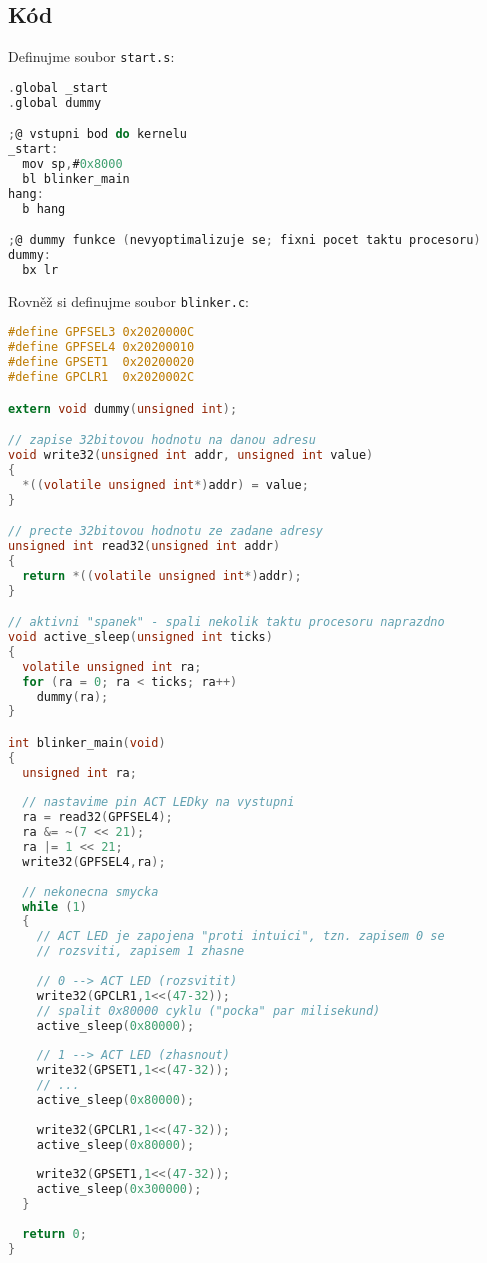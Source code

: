 \documentclass{article}
\begin{document}
\subsection{Kód}

Definujme soubor \texttt{start.s}:

\begin{lstlisting}[language=C]
.global _start
.global dummy

;@ vstupni bod do kernelu
_start:
  mov sp,#0x8000
  bl blinker_main
hang:
  b hang

;@ dummy funkce (nevyoptimalizuje se; fixni pocet taktu procesoru)
dummy:
  bx lr
\end{lstlisting}

Rovněž si definujme soubor \texttt{blinker.c}:

\begin{lstlisting}[language=C]
#define GPFSEL3 0x2020000C
#define GPFSEL4 0x20200010
#define GPSET1  0x20200020
#define GPCLR1  0x2020002C

extern void dummy(unsigned int);

// zapise 32bitovou hodnotu na danou adresu
void write32(unsigned int addr, unsigned int value)
{
  *((volatile unsigned int*)addr) = value;
}

// precte 32bitovou hodnotu ze zadane adresy
unsigned int read32(unsigned int addr)
{
  return *((volatile unsigned int*)addr);
}

// aktivni "spanek" - spali nekolik taktu procesoru naprazdno
void active_sleep(unsigned int ticks)
{
  volatile unsigned int ra;
  for (ra = 0; ra < ticks; ra++)
    dummy(ra);
}

int blinker_main(void)
{
  unsigned int ra;
	
  // nastavime pin ACT LEDky na vystupni
  ra = read32(GPFSEL4);
  ra &= ~(7 << 21);
  ra |= 1 << 21;
  write32(GPFSEL4,ra);
	
  // nekonecna smycka
  while (1)
  {
    // ACT LED je zapojena "proti intuici", tzn. zapisem 0 se
    // rozsviti, zapisem 1 zhasne
		
    // 0 --> ACT LED (rozsvitit)
    write32(GPCLR1,1<<(47-32));
    // spalit 0x80000 cyklu ("pocka" par milisekund)
    active_sleep(0x80000);
		
    // 1 --> ACT LED (zhasnout)
    write32(GPSET1,1<<(47-32));
    // ...
    active_sleep(0x80000);
		
    write32(GPCLR1,1<<(47-32));
    active_sleep(0x80000);
		
    write32(GPSET1,1<<(47-32));
    active_sleep(0x300000);
  }
	
  return 0;
}
\end{lstlisting}
\end{document}
